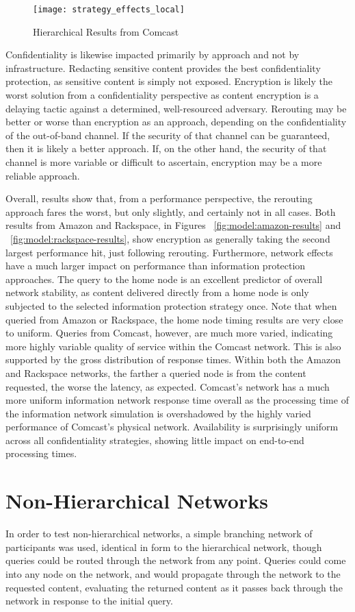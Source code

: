 \begin{figure}[!t]
\centering
\texttt{[image: strategy\_effects\_local]}
\caption{Hierarchical Results from Comcast}
\label{fig:model:comcast-results}
\end{figure}

Confidentiality is likewise impacted primarily by approach and not by infrastructure.  Redacting sensitive content provides the best confidentiality protection, as sensitive content is simply not exposed.  Encryption is likely the worst solution from a confidentiality perspective as content encryption is a delaying tactic against a determined, well-resourced adversary.  Rerouting may be better or worse than encryption as an approach, depending on the confidentiality of the out-of-band channel.  If the security of that channel can be guaranteed, then it is likely a better approach.  If, on the other hand, the security of that channel is more variable or difficult to ascertain, encryption may be a more reliable approach.

Overall, results show that, from a performance perspective, the rerouting approach fares the worst, but only slightly, and certainly not in all cases.  Both results from Amazon and Rackspace, in Figures ~\ref{fig:model:amazon-results} and ~\ref{fig:model:rackspace-results}, show encryption as generally taking the second largest performance hit, just following rerouting.  Furthermore, network effects have a much larger impact on performance than information protection approaches.  The query to the home node is an excellent predictor of overall network stability, as content delivered directly from a home node is only subjected to the selected information protection strategy once.  Note that when queried from Amazon or Rackspace, the home node timing results are very close to uniform.  Queries from Comcast, however, are much more varied, indicating more highly variable quality of service within the Comcast network.  This is also supported by the gross distribution of response times.  Within both the Amazon and Rackspace networks, the farther a queried node is from the content requested, the worse the latency, as expected.  Comcast's network has a much more uniform information network response time overall as the processing time of the information network simulation is overshadowed by the highly varied performance of Comcast's physical network.  Availability is surprisingly uniform across all confidentiality strategies, showing little impact on end-to-end processing times.

\section{Non-Hierarchical Networks}
In order to test non-hierarchical networks, a simple branching network of participants was used, identical in form to the hierarchical network, though queries could be routed through the network from any point.  Queries could come into any node on the network, and would propagate through the network to the requested content, evaluating the returned content as it passes back through the network in response to the initial query.

